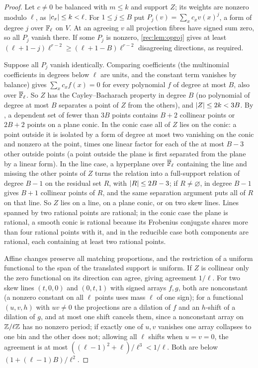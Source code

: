 \begin{proof}
Let $c\ne0$ be balanced with $m\le k$ and support $Z$; its weights are nonzero modulo $\ell$, as $\lvert c_x\rvert\le k<\ell$. For $1\le j\le B$
put $P_j(v)=\sum_xc_xv(x)^j$, a form of degree $j$ over $\mathbb{F}_\ell$ on $V$. At an agreeing $v$ all projection fibres have signed
sum zero, so all $P_j$ vanish there. If some $P_j$ is nonzero, \cref{rec:lem:oproj} gives at least $(\ell+1-j)\ell^{r-2}\ge(\ell+1-B)\ell^{r-2}$
disagreeing directions, as required.

Suppose all $P_j$ vanish identically. Comparing coefficients (the multinomial coefficients in degrees below $\ell$
are units, and the constant term vanishes by balance) gives $\sum_xc_xf(x)=0$ for every polynomial $f$ of degree at
most $B$, also over $\overline{\mathbb{F}}_\ell$. So $Z$ has the Cayley--Bacharach property in degree $B$ (no polynomial of degree at most
$B$ separates a point of $Z$ from the others), and $\lvert Z\rvert\le2k<3B$. By \cite[Theorem~3.8, Proposition~8.2]{Couvreur2012Dual}, a
dependent set of fewer than $3B$ points contains $B+2$ collinear points or $2B+2$ points on a plane conic. In the
conic case all of $Z$ lies on the conic: a point outside it is isolated by a form of degree at most two
vanishing on the conic and nonzero at the point, times one linear factor for each of the at most $B-3$ other
outside points (a point outside the plane is first separated from the plane by a linear form). In the line
case, a hyperplane over $\overline{\mathbb{F}}_\ell$ containing the line and missing the other points of $Z$ turns the relation into a
full-support relation of degree $B-1$ on the residual set $R$, with $\lvert R\rvert\le2B-3$; if $R\ne\varnothing$,
\cite[Proposition~7.3]{Couvreur2012Dual} in degree $B-1$ gives $B+1$ collinear points of $R$, and the same separation
argument puts all of $R$ on that line. So $Z$ lies on a line, on a plane conic, or on two skew lines. Lines
spanned by two rational points are rational; in the conic case the plane is rational, a smooth conic is
rational because its Frobenius conjugate shares more than four rational points with it, and in the reducible
case both components are rational, each containing at least two rational points.

Affine changes preserve all matching proportions, and the restriction of a uniform functional to the span
of the translated support is uniform. If $Z$ is collinear only the zero functional on its direction can
agree, giving agreement $1/\ell$. For two skew lines $(t,0,0)$ and $(0,t,1)$ with signed arrays $f,g$, both are nonconstant
(a nonzero constant on all $\ell$ points uses mass $\ell$ of one sign); for a functional $(u,v,h)$ with $uv\ne0$ the
projections are a dilation of $f$ and an $h$-shift of a dilation of $g$, and at most one shift cancels them, since a
nonconstant array on $\mathbb{Z}/\ell\mathbb{Z}$ has no nonzero period; if exactly one of $u,v$ vanishes one array collapses to one bin
and the other does not; allowing all $\ell$ shifts when $u=v=0$, the agreement is at most $((\ell-1)^2+\ell)/\ell^3<1/\ell$.
Both are below $(1+(\ell-1)B)/\ell^2$.


\end{proof}

